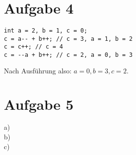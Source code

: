 \section{Aufgabe 4}
\begin{lstlisting}
int a = 2, b = 1, c = 0;
c = a-- + b++; // c = 3, a = 1, b = 2
c = c++; // c = 4
c = --a + b++; // c = 2, a = 0, b = 3
\end{lstlisting}
Nach Ausführung also: $a = 0, b = 3, c = 2$.

\section{Aufgabe 5}
\begin{description}
\item[a)] 
\item[b)] 
\item[c)]
\end{description}




